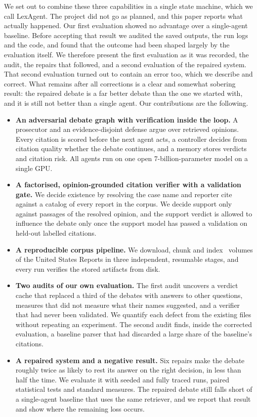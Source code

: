 \documentclass[conference]{IEEEtran}
\newcommand{\sys}{LexAgent}
\begin{document}
We set out to combine these three capabilities in a single state machine, which we call \sys. The project did not go as planned, and this paper reports what actually happened. Our first evaluation showed no advantage over a single-agent baseline. Before accepting that result we audited the saved outputs, the run logs and the code, and found that the outcome had been shaped largely by the evaluation itself. We therefore present the first evaluation as it was recorded, the audit, the repairs that followed, and a second evaluation of the repaired system. That second evaluation turned out to contain an error too, which we describe and correct. What remains after all corrections is a clear and somewhat sobering result: the repaired debate is a far better debate than the one we started with, and it is still not better than a single agent. Our contributions are the following.
\begin{itemize}
\item \textbf{An adversarial debate graph with verification inside the loop.} A prosecutor and an evidence-disjoint defense argue over retrieved opinions. Every citation is scored before the next agent acts, a controller decides from citation quality whether the debate continues, and a memory stores verdicts and citation risk. All agents run on one open 7-billion-parameter model on a single GPU.
\item \textbf{A factorised, opinion-grounded citation verifier with a validation gate.} We decide existence by resolving the case name and reporter cite against a catalog of every report in the corpus. We decide support only against passages of the resolved opinion, and the support verdict is allowed to influence the debate only once the support model has passed a validation on held-out labelled citations.
\item \textbf{A reproducible corpus pipeline.} We download, chunk and index \ResCorpusVolumes\ volumes of the United States Reports in three independent, resumable stages, and every run verifies the stored artifacts from disk.
\item \textbf{Two audits of our own evaluation.} The first audit uncovers a verdict cache that replaced a third of the debates with answers to other questions, measures that did not measure what their names suggested, and a verifier that had never been validated. We quantify each defect from the existing files without repeating an experiment. The second audit finds, inside the corrected evaluation, a baseline parser that had discarded a large share of the baseline's citations.
\item \textbf{A repaired system and a negative result.} Six repairs make the debate roughly twice as likely to rest its answer on the right decision, in less than half the time. We evaluate it with seeded and fully traced runs, paired statistical tests and standard measures. The repaired debate still falls short of a single-agent baseline that uses the same retriever, and we report that result and show where the remaining loss occurs.
\end{itemize}
\end{document}
